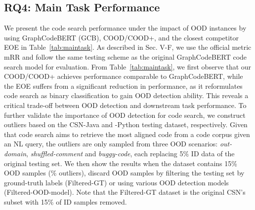 \subsection{RQ4: Main Task Performance}
We present the code search performance under the impact of OOD instances by using GraphCodeBERT (GCB), COOD/COOD+, and the closest competitor EOE in Table~\ref{tab:maintask}. As described in Sec. V-F, we use the official metric mRR  and follow the same testing scheme as the original GraphCodeBERT code search model for evaluation. From Table~\ref{tab:maintask}, we first observe that our COOD/COOD+ achieves performance comparable to GraphCodeBERT, while the EOE suffers from a significant reduction in performance, as it reformulates code search as binary classification to gain OOD detection ability. This reveals a critical trade-off between OOD detection and downstream task performance. To further validate the importance of OOD detection for code search, we construct outliers based on the CSN-Java and -Python testing dataset, respectively. Given that code search aims to retrieve the most aligned code from a code corpus given an NL query, the outliers are only sampled from three OOD scenarios: \textit{out-domain}, \textit{shuffled-comment} and \textit{buggy-code}, each replacing 5\% ID data of the original testing set. We then show the results when the dataset contains 15\% OOD samples (\% outliers), discard OOD samples by filtering the testing set by ground-truth labels (\ie Filtered-GT) or using various OOD detection models (\ie Filtered-OOD-model). Note that the Filtered-GT dataset is the original CSN's subset with 15\% of ID samples removed.



